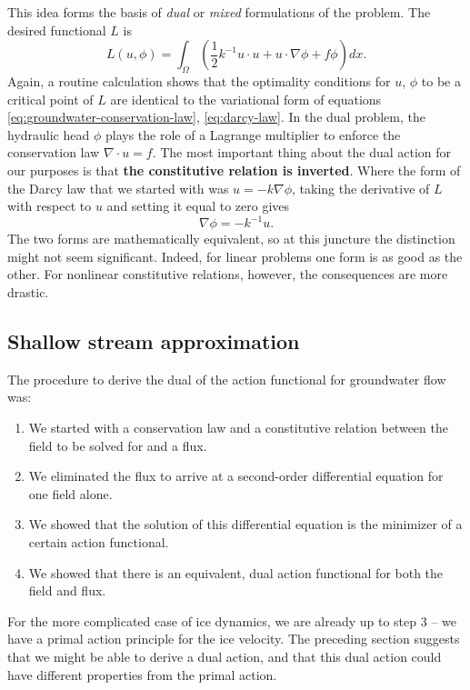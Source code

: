 \documentclass{article}
\theoremstyle{definition}
\theoremstyle{plain}
\begin{document}
This idea forms the basis of \emph{dual} or \emph{mixed} formulations of the problem.
The desired functional $L$ is
\begin{equation}
    L(u, \phi) = \int_\Omega\left(\frac{1}{2}k^{-1}u\cdot u + u\cdot\nabla \phi + f\phi\right)dx.
\end{equation}
Again, a routine calculation shows that the optimality conditions for $u$, $\phi$ to be a critical point of $L$ are identical to the variational form of equations \eqref{eq:groundwater-conservation-law}, \eqref{eq:darcy-law}.
In the dual problem, the hydraulic head $\phi$ plays the role of a Lagrange multiplier to enforce the conservation law $\nabla\cdot u = f$.
The most important thing about the dual action for our purposes is that \textbf{the constitutive relation is inverted}.
Where the form of the Darcy law that we started with was $u = -k\nabla\phi$, taking the derivative of $L$ with respect to $u$ and setting it equal to zero gives
\begin{equation}
    \nabla\phi = -k^{-1}u.
\end{equation}
The two forms are mathematically equivalent, so at this juncture the distinction might not seem significant.
Indeed, for linear problems one form is as good as the other.
For nonlinear constitutive relations, however, the consequences are more drastic.

\subsection{Shallow stream approximation}

The procedure to derive the dual of the action functional for groundwater flow was:
\begin{enumerate}
    \item We started with a conservation law and a constitutive relation between the field to be solved for and a flux.
    \item We eliminated the flux to arrive at a second-order differential equation for one field alone.
    \item We showed that the solution of this differential equation is the minimizer of a certain action functional.
    \item We showed that there is an equivalent, dual action functional for both the field and flux.
\end{enumerate}
For the more complicated case of ice dynamics, we are already up to step 3 -- we have a primal action principle for the ice velocity.
The preceding section suggests that we might be able to derive a dual action, and that this dual action could have different properties from the primal action.
\end{document}
